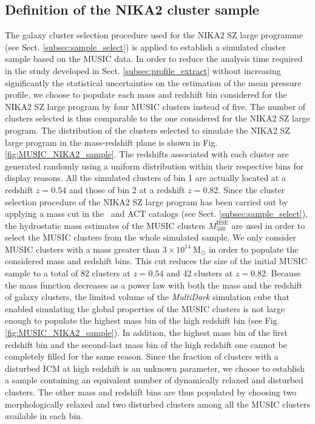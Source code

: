 \documentclass[twocolumn,traditabstract]{aa}
\begin{document}
\subsection{Definition of the NIKA2 cluster sample}\label{subsec:nika2_sample}

The galaxy cluster selection procedure used for the NIKA2 SZ large programme (see Sect. \ref{subsec:sample_select}) is applied to establish a simulated cluster sample based on the MUSIC data. In order to reduce the analysis time required in the study developed in Sect. \ref{subsec:profile_extract} without increasing significantly the statistical uncertainties on the estimation of the mean pressure profile, we choose to populate each mass and redshift bin considered for the NIKA2 SZ large program by four MUSIC clusters instead of five. The number of clusters selected is thus comparable to the one considered for the NIKA2 SZ large program. The distribution of the clusters selected to simulate the NIKA2 SZ large program in the mass-redshift plane is shown in Fig. \ref{fig:MUSIC_NIKA2_sample}. The redshifts associated with each cluster are generated randomly using a uniform distribution within their respective bins for display reasons. All the simulated clusters of bin 1 are actually located at a redshift $z=0.54$ and those of bin 2 at a redshift $z=0.82$. Since the cluster selection procedure of the NIKA2 SZ large program has been carried out by applying a mass cut in the \planck\ and ACT catalogs (see Sect. \ref{subsec:sample_select}), the hydrostatic mass estimates of the MUSIC clusters $M_{500}^{\mathrm{HSE}}$ are used in order to select the MUSIC clusters from the whole simulated sample. We only consider MUSIC clusters with a mass greater than $3\times 10^{14}~\mathrm{M_{\odot}}$ in order to populate the considered mass and redshift bins. This cut reduces the size of the initial MUSIC sample to a total of 82 clusters at $z=0.54$ and 42 clusters at $z=0.82$. Because the mass function decreases as a power law with both the mass and the redshift of galaxy clusters, the limited volume of the \emph{MultiDark} simulation cube that enabled simulating the global properties of the MUSIC clusters is not large enough to populate the highest mass bin of the high redshift bin (see Fig. \ref{fig:MUSIC_NIKA2_sample}). In addition, the highest mass bin of the first redshift bin and the second-last mass bin of the high redshift one cannot be completely filled for the same reason. Since the fraction of clusters with a disturbed ICM at high redshift is an unknown parameter, we choose to establish a sample containing an equivalent number of dynamically relaxed and disturbed clusters. The other mass and redshift bins are thus populated by choosing two morphologically relaxed and two disturbed clusters among all the MUSIC clusters available in each bin.\\
\end{document}
